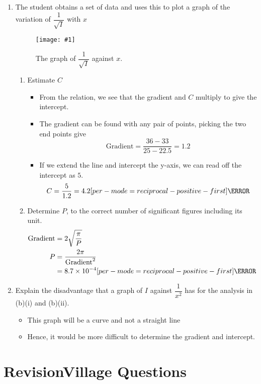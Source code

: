 \documentclass[a4paper,12pt]{article}
\let\oldsection\section
\renewcommand\section{\clearpage\oldsection}
\let\oldsi\si
\renewcommand{\si}[1]{\oldsi[per-mode=reciprocal-positive-first]{#1}}
\newcommand{\img}[4]{\begin{center}
  \begin{figure}[H]
    \centering
    \texttt{[image: \#1]}
    \caption{#3}
    \label{fig:#4}
  \end{figure}
\end{center}}
\begin{document}
\begin{enumerate}[label=(\alph*)]
  \item The student obtains a set of data and uses this to plot a graph of the variation of $\dfrac{1}{\sqrt{I}}$ with $x$
        \img{ex/14.png}{1}{The graph of $\dfrac{1}{\sqrt{I}}$ against $x$.}{14}
        \begin{enumerate}[label=(\roman*)]
          \item Estimate $C$
                \begin{itemize}
                  \item From the relation, we see that the gradient and $C$ multiply to give the intercept.
                  \item The gradient can be found with any pair of points, picking the two end points give
                        $$\text{Gradient} = \frac{36 - 33}{25 - 22.5} = 1.2$$

                  \item If we extend the line and intercept the y-axis, we can read off the intercept as $5$.
                        $$C = \frac{5}{1.2} = 4.2\si{\cm}$$
                \end{itemize}
          \item Determine $P$, to the correct number of significant figures including its unit.
                \begin{align*}
                  \text{Gradient} & = 2\sqrt{\frac{\pi}{P}}          \\
                  P               & = \frac{2\pi}{\text{Gradient}^2} \\
                                  & = 8.7 \times 10^{-4} \si{\watt}
                \end{align*}
        \end{enumerate}
  \item Explain the disadvantage that a graph of $I$ against $\dfrac{1}{x^2}$ has for the analysis in (b)(i) and (b)(ii).
        \begin{itemize}
          \item This graph will be a curve and not a straight line
          \item Hence, it would be more difficult to determine the gradient and intercept.
        \end{itemize}
\end{enumerate}

\section{RevisionVillage Questions}
\end{document}
